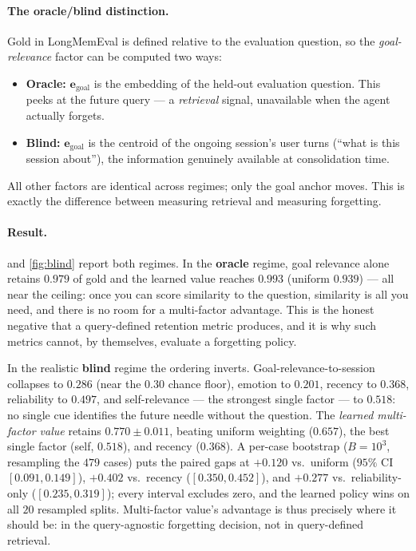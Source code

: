 \paragraph{The oracle/blind distinction.}
Gold in LongMemEval is defined relative to the evaluation question, so
the \emph{goal-relevance} factor can be computed two ways:
\begin{itemize}[leftmargin=1.4em,itemsep=1pt,topsep=2pt]
\item \textbf{Oracle:} $\mathbf{e}_{\text{goal}}$ is the embedding of the
held-out evaluation question. This peeks at the future query --- a
\emph{retrieval} signal, unavailable when the agent actually forgets.
\item \textbf{Blind:} $\mathbf{e}_{\text{goal}}$ is the centroid of the
ongoing session's user turns (``what is this session about''), the
information genuinely available at consolidation time.
\end{itemize}
All other factors are identical across regimes; only the goal anchor
moves. This is exactly the difference between measuring retrieval and
measuring forgetting.

\paragraph{Result.}
 and \cref{fig:blind} report both regimes. In the \textbf{oracle} regime,
goal relevance alone retains $0.979$ of gold and the learned value reaches
$0.993$ (uniform $0.939$) --- all near the ceiling: once you can score
similarity to the question, similarity is all you need, and there is no
room for a multi-factor advantage. This is the honest negative that a
query-defined retention metric produces, and it is why such metrics
cannot, by themselves, evaluate a forgetting policy.

In the realistic \textbf{blind} regime the ordering inverts.
Goal-relevance-to-session collapses to $0.286$ (near the $0.30$ chance
floor), emotion to $0.201$, recency to $0.368$, reliability to $0.497$,
and self-relevance --- the strongest single factor --- to $0.518$: no
single cue identifies the future needle without the question. The
\emph{learned multi-factor value} retains $\mathbf{0.770\pm0.011}$,
beating uniform weighting ($0.657$), the best single factor (self,
$0.518$), and recency ($0.368$). A per-case bootstrap ($B{=}10^3$,
resampling the $479$ cases) puts the paired gaps at $+0.120$ vs.\ uniform
($95\%$ CI $[0.091,0.149]$), $+0.402$ vs.\ recency ($[0.350,0.452]$), and
$+0.277$ vs.\ reliability-only ($[0.235,0.319]$); every interval excludes
zero, and the learned policy wins on all $20$ resampled splits.
Multi-factor value's advantage is thus precisely where it should be: in
the query-agnostic forgetting decision, not in query-defined retrieval.

